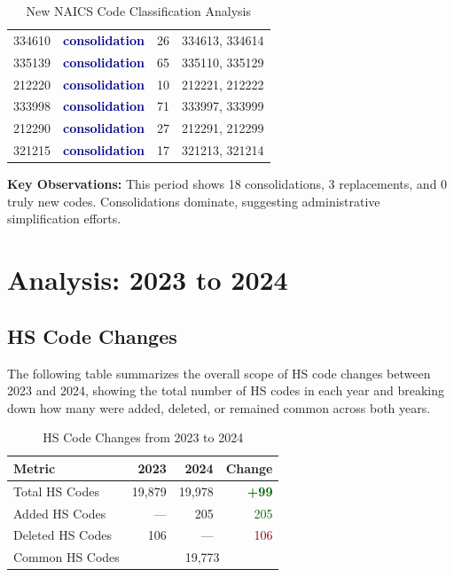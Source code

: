 \documentclass[11pt]{article}
\newcommand{\increase}[1]{\textcolor{darkgreen}{\textbf{+#1}}}
\begin{document}
\begin{table}[H]
\begin{tabular}{llrl}
334610 & \textcolor{darkblue}{\textbf{consolidation}} & 26 & 334613, 334614 \\
335139 & \textcolor{darkblue}{\textbf{consolidation}} & 65 & 335110, 335129 \\
212220 & \textcolor{darkblue}{\textbf{consolidation}} & 10 & 212221, 212222 \\
333998 & \textcolor{darkblue}{\textbf{consolidation}} & 71 & 333997, 333999 \\
212290 & \textcolor{darkblue}{\textbf{consolidation}} & 27 & 212291, 212299 \\
321215 & \textcolor{darkblue}{\textbf{consolidation}} & 17 & 321213, 321214 \\
\bottomrule
\end{tabular}
\caption{New NAICS Code Classification Analysis}
\end{table}

\textbf{Key Observations:} This period shows 18 consolidations, 3 replacements, and 0 truly new codes. Consolidations dominate, suggesting administrative simplification efforts.

\newpage


\section{Analysis: 2023 to 2024}

\subsection{HS Code Changes}

The following table summarizes the overall scope of HS code changes between 2023 and 2024, showing the total number of HS codes in each year and breaking down how many were added, deleted, or remained common across both years.

\begin{table}[H]
\centering
{}
\begin{tabular}{lrrr}
\toprule
\textbf{Metric} & \textbf{2023} & \textbf{2024} & \textbf{Change} \\
\midrule
Total HS Codes & 19,879 & 19,978 & \increase{99} \\
Added HS Codes & --- & 205 & \textcolor{darkgreen}{205} \\
Deleted HS Codes & 106 & --- & \textcolor{darkred}{106} \\
Common HS Codes & \multicolumn{3}{c}{19,773} \\
\bottomrule
\end{tabular}
\caption{HS Code Changes from 2023 to 2024}
\end{table}
\end{document}
